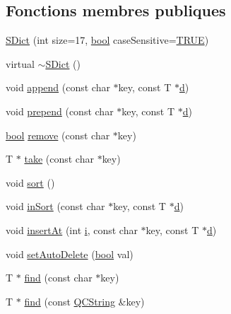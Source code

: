 \subsection*{Fonctions membres publiques}
\begin{DoxyCompactItemize}
\item 
\hyperlink{class_s_dict_a302a5a7c25fce8e9e93f7dede81ad503}{S\+Dict} (int size=17, \hyperlink{qglobal_8h_a1062901a7428fdd9c7f180f5e01ea056}{bool} case\+Sensitive=\hyperlink{qglobal_8h_a04a6422a52070f0dc478693da640242b}{T\+R\+U\+E})
\item 
virtual \hyperlink{class_s_dict_a49594f6c587e0915be3861538a3c96cb}{$\sim$\+S\+Dict} ()
\item 
void \hyperlink{class_s_dict_a121842d9858421076b81ed663034d62c}{append} (const char $\ast$key, const T $\ast$\hyperlink{060__command__switch_8tcl_af43f4b1f0064a33b2d662af9f06d3a00}{d})
\item 
void \hyperlink{class_s_dict_adcfbdc244e81360522457c8a84069f2b}{prepend} (const char $\ast$key, const T $\ast$\hyperlink{060__command__switch_8tcl_af43f4b1f0064a33b2d662af9f06d3a00}{d})
\item 
\hyperlink{qglobal_8h_a1062901a7428fdd9c7f180f5e01ea056}{bool} \hyperlink{class_s_dict_ad647b04c9dff33ac0182c4d83b025c77}{remove} (const char $\ast$key)
\item 
T $\ast$ \hyperlink{class_s_dict_ac5aa2cf317cef817cf585efdab3663d7}{take} (const char $\ast$key)
\item 
void \hyperlink{class_s_dict_ab6da88a61ee284dfbd07830fcd63aed3}{sort} ()
\item 
void \hyperlink{class_s_dict_a25a85aeba441b4c855ea7be25a4741b5}{in\+Sort} (const char $\ast$key, const T $\ast$\hyperlink{060__command__switch_8tcl_af43f4b1f0064a33b2d662af9f06d3a00}{d})
\item 
void \hyperlink{class_s_dict_a7f0a7e316d26fccdf7d0d351837a6614}{insert\+At} (int \hyperlink{060__command__switch_8tcl_a8c90afd4641b25be86bd09983c3cbee0}{i}, const char $\ast$key, const T $\ast$\hyperlink{060__command__switch_8tcl_af43f4b1f0064a33b2d662af9f06d3a00}{d})
\item 
void \hyperlink{class_s_dict_ac5ed340a2e6b4b4fb8398254cd35ef55}{set\+Auto\+Delete} (\hyperlink{qglobal_8h_a1062901a7428fdd9c7f180f5e01ea056}{bool} val)
\item 
T $\ast$ \hyperlink{class_s_dict_aec67482d780157680d46f48a7ed5e7bd}{find} (const char $\ast$key)
\item 
T $\ast$ \hyperlink{class_s_dict_a357a25974d906de30d2e34de08b35a4e}{find} (const \hyperlink{class_q_c_string}{Q\+C\+String} \&key)

\end{DoxyCompactItemize}
